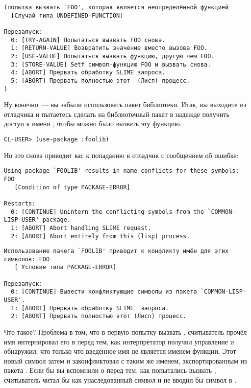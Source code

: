 \begin{lstlisting}
(попытка вызвать `FOO', которая является неопределённой функцией
  [Случай типа UNDEFINED-FUNCTION]

Перезапуск:
  0: [TRY-AGAIN] Попытаться вызвать FOO снова.
  1: [RETURN-VALUE] Возвратить значение вместо вызова FOO.
  2: [USE-VALUE] Попытаться вызвать функцию, другую чем FOO.
  3: [STORE-VALUE] Setf символ-функцию FOO и вызвать снова.
  4: [ABORT] Прервать обработку SLIME запроса.
  5: [ABORT] Прервать полностью этот  (Лисп) процесс.
)
\end{lstlisting}

Ну конечно~--- вы забыли использовать пакет библиотеки. Итак, вы выходите из отладчика и
пытаетесь сделать  на библиотечный пакет в надежде получить доступ к
имени , чтобы можно было вызвать эту функцию.

\begin{lstlisting}
CL-USER> (use-package :foolib)
\end{lstlisting}

Но это снова приводит вас к попаданию в отладчик с сообщением об ошибке:

\begin{lstlisting}
Using package `FOOLIB' results in name conflicts for these symbols: FOO
   [Condition of type PACKAGE-ERROR]

Restarts:
  0: [CONTINUE] Unintern the conflicting symbols from the `COMMON-LISP-USER' package.
  1: [ABORT] Abort handling SLIME request.
  2: [ABORT] Abort entirely from this (lisp) process.
\end{lstlisting}

\begin{lstlisting}
Использование пакета `FOOLIB' приводит к конфликту имён для этих символов: FOO
   [ Условие типа PACKAGE-ERROR]

Перезапуск:
  0: [CONTINUE] Вывести конфликтующие символы из пакета `COMMON-LISP-USER'.
  1: [ABORT] Прервать обработку SLIME  запроса.
  2: [ABORT] Прервать полностью этот (Лисп) процесс.
\end{lstlisting}

Что такое? Проблема в том, что в первую попытку вызвать , считыватель прочёл имя
 интернировал его в  перед тем, как интерпретатор получил
управление и обнаружил, что только что введённое имя не является именем функции. Этот
новый символ затем и законфликтовал с таким же именем, экспортированным из пакета
. Если бы вы вспомнили о  перед тем, как попытались
вызвать , считыватель читал бы  как унаследованный символ и не вводил
бы  символ в .

